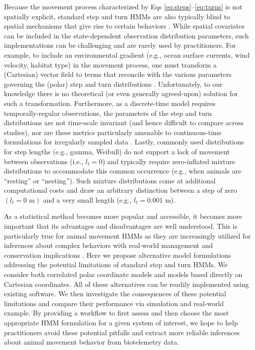 \documentclass[12pt]{article}\usepackage[]{graphicx}\usepackage[]{xcolor}
\begin{document}
Because the movement process characterized by Eqs \ref{eq:steps}--\ref{eq:turns} is not spatially explicit, standard step and turn HMMs are also typically blind to spatial mechanisms that give rise to certain behaviors \citep[e.g.,][]{glennie2023hidden}. While spatial covariates can be included in the state-dependent observation distribution parameters, such implementations can be challenging and are rarely used by practitioners. For example, to include an environmental gradient (e.g., ocean surface currents, wind velocity, habitat type) in the movement process, one must transform a (Cartesian) vector field to terms that reconcile with the various parameters governing the (polar) step and turn distributions \citep[e.g.,][]{McClintockMichelot2018,PirottaEtAl2018,mul2020killer}. Unfortunately, to our knowledge there is no theoretical (or even generally agreed-upon) solution for such a transformation. Furthermore, as a discrete-time model requires temporally-regular observations, the parameters of the step and turn distributions are not time-scale invariant (and hence difficult to compare across studies), nor are these metrics particularly amenable to continuous-time formulations for irregularly sampled data \citep[but see][]{parton2017bayesian,eisaguirre2024rayleigh}. Lastly, commonly used distributions for step lengths (e.g., gamma, Weibull) do not support a lack of movement between observations (i.e., $l_t=0$) and typically require zero-inflated mixture distributions to accommodate this common occurrence (e.g., when animals are ``resting'' or ``nesting''). Such mixture distributions come at additional computational costs and draw an arbitrary distinction between a step of zero $(l_t=0 \text{ m})$ and a very small length (e.g., $l_t=0.001$ m).

As a statistical method becomes more popular and accessible, it becomes more important that its advantages and disadvantages are well understood. This is particularly true for animal movement HMMs as they are increasingly utilized for inferences about complex behaviors with real-world management and conservation implications \citep[e.g.,][]{russell2014marine,CarterEtAl2020,mul2020killer,nickel2021energetics,bassing2024predator}. Here we propose alternative model formulations addressing the potential limitations of standard step and turn HMMs. We consider both correlated polar coordinate models and models based directly on Cartesian coordinates. All of these alternatives can be readily implemented using existing software. We then investigate the consequences of these potential limitations and compare their performance via simulation and real-world example. By providing a workflow to first assess and then choose the most appropriate HMM formulation for a given system of interest, we hope to help practitioners avoid these potential pitfalls and extract more reliable inferences about animal movement behavior from biotelemetry data.
\end{document}
